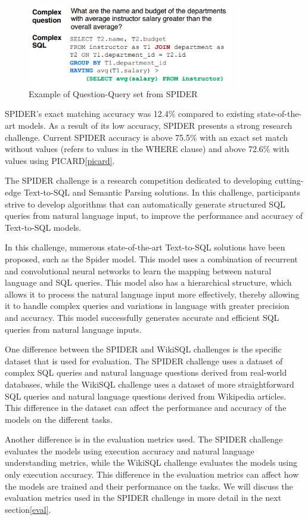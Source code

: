 \begin{figure}[htb]
    \centering
    \includegraphics[width=0.8\textwidth]{pics/db/Spider2.png}
    \caption{Example of Question-Query set from SPIDER\cite{yu_spider_2019}}
    \label{fig:Spider2}
\end{figure}

SPIDER's exact matching accuracy was 12.4\% compared to existing state-of-the-art models. As a result of its low accuracy, SPIDER presents a strong research challenge. Current SPIDER accuracy is above 75.5\% with an exact set match without values (refers to values in the WHERE clause) and above 72.6\% with values using PICARD\ref{picard}.

The SPIDER challenge is a research competition dedicated to developing cutting-edge Text-to-SQL and Semantic Parsing solutions. In this challenge, participants strive to develop algorithms that can automatically generate structured SQL queries from natural language input, to improve the performance and accuracy of Text-to-SQL models.

In this challenge, numerous state-of-the-art Text-to-SQL solutions have been proposed, such as the Spider model. This model uses a combination of recurrent and convolutional neural networks to learn the mapping between natural language and SQL queries. This model also has a hierarchical structure, which allows it to process the natural language input more effectively, thereby allowing it to handle complex queries and variations in language with greater precision and accuracy. This model successfully generates accurate and efficient SQL queries from natural language inputs.

One difference between the SPIDER and WikiSQL challenges is the specific dataset that is used for evaluation. The SPIDER challenge uses a dataset of complex SQL queries and natural language questions derived from real-world databases, while the WikiSQL challenge uses a dataset of more straightforward SQL queries and natural language questions derived from Wikipedia articles. This difference in the dataset can affect the performance and accuracy of the models on the different tasks.

Another difference is in the evaluation metrics used. The SPIDER challenge evaluates the models using execution accuracy and natural language understanding metrics, while the WikiSQL challenge evaluates the models using only execution accuracy. This difference in the evaluation metrics can affect how the models are trained and their performance on the tasks. We will discuss the evaluation metrics used in the SPIDER challenge in more detail in the next section\ref{eval}.